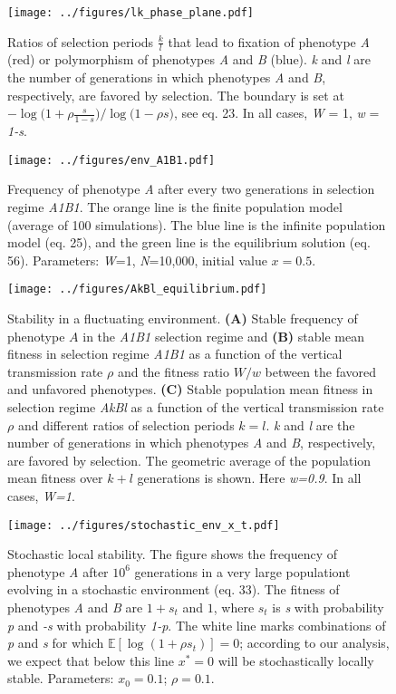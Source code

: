 \documentclass[]{article}
\begin{document}
\begin{figure}
\centering
\texttt{[image: ../figures/lk\_phase\_plane.pdf]}
\caption{Ratios of selection periods \(\frac{k}{l}\) that lead to
fixation of phenotype \emph{A} (red) or polymorphism of phenotypes
\emph{A} and \emph{B} (blue). \emph{k} and \emph{l} are the number of
generations in which phenotypes \emph{A} and \emph{B}, respectively, are favored by selection.
The boundary is set at $-\log{(1+\rho \frac{s}{1-s}}) / \log{(1-\rho s})$, see eq. 23.
In all cases, \emph{W} = 1, \emph{w} = \emph{1-s}.}\label{fig:lk_phase_plane}
\end{figure}

\begin{figure}
\centering
\texttt{[image: ../figures/env\_A1B1.pdf]}
\caption{Frequency of phenotype \emph{A} after every two generations in
selection regime \emph{A1B1}. The orange line is the finite population model
(average of 100 simulations). The blue line is the infinite population model
(eq. 25), and the green line is the equilibrium solution (eq. 56). Parameters: \emph{W}=1,
\emph{N}=10,000, initial value \(x=0.5\).}\label{fig:env_A1B1}
\end{figure}

\begin{figure}
\centering
\texttt{[image: ../figures/AkBl\_equilibrium.pdf]}
\caption{Stability in a fluctuating environment.
\textbf{(A)} Stable frequency of phenotype $A$ in the \emph{A1B1} selection regime and \textbf{(B)} stable mean fitness in selection regime \emph{A1B1} as a function of the vertical transmission rate \(\rho\) and the fitness ratio \(W/w\) between the favored and unfavored phenotypes.
\textbf{(C)} Stable population mean fitness in selection regime \emph{AkBl} as a
function of the vertical transmission rate \(\rho\) and different ratios of selection periods \(k=l\). \emph{k} and \emph{l} are the number of generations in which phenotypes \emph{A} and \emph{B}, respectively, are favored by selection.
The geometric average of the population mean fitness over $k+l$ generations is shown. 
Here \emph{w=0.9}.
In all cases, \emph{W=1}.
}\label{fig:AkBl_equilibrium}
\end{figure}

\begin{figure}
\centering
\texttt{[image: ../figures/stochastic\_env\_x\_t.pdf]}
\caption{Stochastic local stability. The figure shows the frequency of
phenotype \emph{A} after \(10^6\) generations in a very large populationt 
evolving in a stochastic environment (eq. 33). The
fitness of phenotypes \emph{A} and \emph{B} are \(1+s_t\) and \(1\),
where \(s_t\) is \emph{s} with probability \emph{p} and \emph{-s} with
probability \emph{1-p}. The white line marks combinations of \emph{p}
and \emph{s} for which \(\mathbb{E}[\log{(1+\rho s_t)}]=0\); according
to our analysis, we expect that below this line \(x^*=0\) will be
stochastically locally stable. Parameters: \(x_0=0.1\);
\(\rho=0.1\).}\label{fig:stochastic_env_x_t}
\end{figure}
\end{document}
